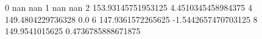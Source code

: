 0 nan nan
1 nan nan
2 153.93145751953125 4.4510345458984375
4 149.4804229736328 0.0
6 147.9361572265625 -1.5442657470703125
8 149.9541015625 0.4736785888671875
